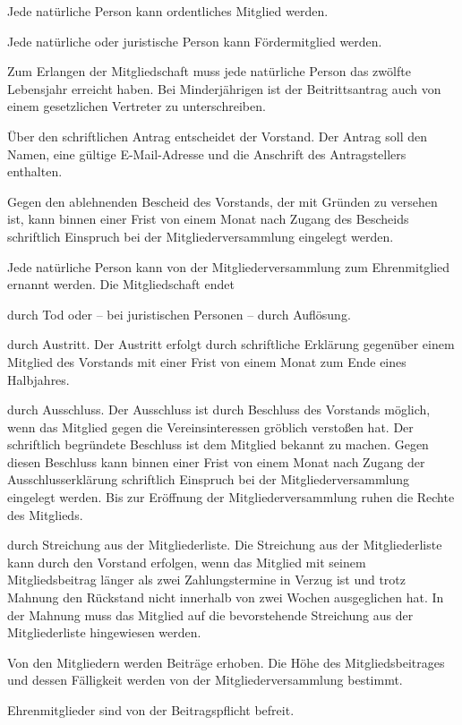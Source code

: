 \begin{contract}
	\item Jede natürliche Person kann ordentliches Mitglied werden.
	\item Jede natürliche oder juristische Person kann Fördermitglied werden.
	\item Zum Erlangen der Mitgliedschaft muss jede natürliche Person das zwölfte Lebensjahr erreicht haben. Bei Minderjährigen ist der Beitrittsantrag auch von einem gesetzlichen Vertreter zu unterschreiben.
	\item Über den schriftlichen Antrag entscheidet der Vorstand. Der Antrag soll den Namen, eine gültige E-Mail-Adresse und die Anschrift des Antragstellers ent\-halten.
	\item Gegen den ablehnenden Bescheid des Vorstands, der mit Gründen zu versehen ist, kann binnen einer Frist von einem Monat nach Zugang des Bescheids schriftlich Einspruch bei der Mitgliederversammlung eingelegt werden.
	\item Jede natürliche Person kann von der Mitgliederversammlung zum Ehrenmitglied ernannt werden.
Die Mitgliedschaft endet
	\item durch Tod oder – bei juristischen Personen – durch Auflösung.
	\item durch Austritt.
	Der Austritt erfolgt durch schriftliche Erklärung gegenüber einem Mitglied des Vorstands mit einer Frist von einem Monat zum Ende eines Halbjahres.
	\item durch Ausschluss.
	Der Ausschluss ist durch Beschluss des Vorstands möglich, wenn das Mitglied gegen die Vereinsinteressen gröblich verstoßen hat. Der schriftlich begründete Beschluss ist dem Mitglied bekannt zu machen.
	Gegen diesen Beschluss kann binnen einer Frist von einem Monat nach Zugang der Ausschlusserklärung schriftlich Einspruch bei der Mitgliederversammlung eingelegt werden. Bis zur Eröffnung der Mitgliederversammlung ruhen die Rechte des Mitglieds.
	\item durch Streichung aus der Mitgliederliste.
	Die Streichung aus der Mitgliederliste kann durch den Vorstand erfolgen, wenn das Mitglied mit seinem Mitgliedsbeitrag länger als zwei Zahlungstermine in Verzug ist und trotz Mahnung den Rückstand nicht innerhalb von zwei Wochen ausgeglichen hat. In der Mahnung muss das Mitglied auf die bevorstehende Streichung aus der Mitgliederliste hingewiesen werden.

	\item Von den Mitgliedern werden Beiträge erhoben. Die Höhe des Mitgliedsbeitrages und dessen Fälligkeit werden von der Mitgliederversammlung bestimmt.
	\item Ehrenmitglieder sind von der Beitragspflicht befreit.


\end{contract}
